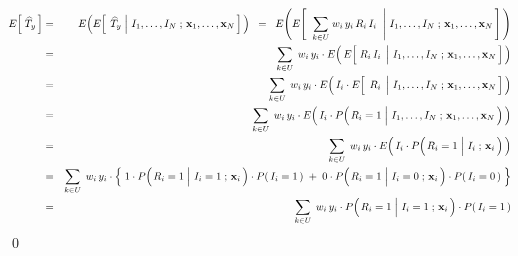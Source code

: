 \begin{eqnarray*}
E\!\left[\;\widehat{T}_{y}\,\right]
& = &
	E\!\left(E\!\left[\;
		\left.\widehat{T}_{y}\;\right\vert\,I_{1},\ldots,I_{N}
		\;;\,\mathbf{x}_{1},\ldots,\mathbf{x}_{N}
		\,\right]\,\right)
\;\; = \;\;
	E\!\left(E\!\left[\;\,
		\left.\underset{k \in U}{\sum}\;w_{i}\,y_{i}\,R_{i}\,I_{i}\;\;\right\vert\,I_{1},\ldots,I_{N}
		\;;\,\mathbf{x}_{1},\ldots,\mathbf{x}_{N}
		\,\right]\,\right)
\\
& = &
	\underset{k \in U}{\sum}\;\,w_{i}\,y_{i}
	\cdot
	E\!\left(\,E\!\left[\,
		\left.\overset{{\color{white}.}}{R_{i}\,I_{i}}\;\,\right\vert\,I_{1},\ldots,I_{N}
		\;;\,\mathbf{x}_{1},\ldots,\mathbf{x}_{N}
		\,\right]\,\right)
\\
& = &
	\underset{k \in U}{\sum}\;\,w_{i}\,y_{i}
	\cdot
	E\!\left(\,I_{i} \cdot E\!\left[\,
		\left.\,\overset{{\color{white}.}}{R_{i}}\;\,\right\vert\,I_{1},\ldots,I_{N}
		\;;\,\mathbf{x}_{1},\ldots,\mathbf{x}_{N}
		\,\right]\,\right)
\\
& = &
	\underset{k \in U}{\sum}\;\,w_{i}\,y_{i}
	\cdot
	E\!\left(\,I_{i} \cdot P\!\left(
		\left.\overset{{\color{white}.}}{R_{i}}=1\;\right\vert\,I_{1},\ldots,I_{N}
		\;;\,\mathbf{x}_{1},\ldots,\mathbf{x}_{N}
		\,\right)\,\right)
\\
& = &
	\underset{k \in U}{\sum}\;\,w_{i}\,y_{i}
	\cdot
	E\!\left(\,I_{i} \cdot P\!\left(
		\left.\overset{{\color{white}.}}{R_{i}}=1\;\right\vert\,I_{i}
		\;;\,\mathbf{x}_{i}
		\,\right)\,\right)
\\
& = &
	\underset{k \in U}{\sum}\;\,w_{i}\,y_{i}
	\cdot
	\left\{\;
		1 \cdot P\!\left(\left.
			\overset{{\color{white}.}}{R_{i}}=1\;\right\vert\,I_{i}=1
			\;;\,\mathbf{x}_{i}
			\,\right) \cdot P(\,I_{i}=1\,)
		\; + \;
		0 \cdot P\!\left(\left.
			\overset{{\color{white}.}}{R_{i}}=1\;\right\vert\,I_{i}=0
			\;;\,\mathbf{x}_{i}
			\,\right) \cdot P(\,I_{i}=0\,)
		\;\right\}
\\
& = &
	\underset{k \in U}{\sum}\;\,w_{i}\,y_{i}
	\cdot P\!\left(\left.\overset{{\color{white}.}}{R_{i}}=1\;\right\vert\,I_{i}=1\;;\,\mathbf{x}_{i}\,\right) \cdot P(\,I_{i}=1\,)
\end{eqnarray*}
\qed

